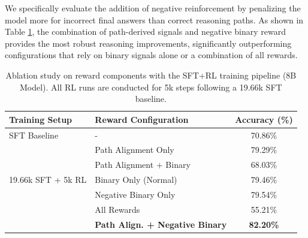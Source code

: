 \documentclass{article}
\theoremstyle{plain}
\theoremstyle{definition}
\theoremstyle{remark}
\begin{document}
We specifically evaluate the addition of negative reinforcement \cite{Zhu2025} by penalizing the model more for incorrect final answers than correct reasoning paths. As shown in Table \ref{tab:sft_rl_ablation}, the combination of path-derived signals and negative binary reward provides the most robust reasoning improvements, significantly outperforming configurations that rely on binary signals alone or a combination of all rewards.

\begin{table}[ht]
\caption{Ablation study on reward components with the SFT+RL training pipeline (8B Model). All RL runs are conducted for 5k steps following a 19.66k SFT baseline.}
\label{tab:sft_rl_ablation}
\vskip 0.15in
\begin{center}
\begin{small}
\begin{sc}
\begin{tabular}{llc}
\toprule
Training Setup & Reward Configuration & Accuracy (\%) \\
\midrule
SFT Baseline  & - & 70.86\% \\
\midrule
\multirow{5}{*}{19.66k SFT + 5k RL} 
  & Path Alignment Only & 79.29\% \\
  & Path Alignment + Binary & 68.03\% \\
  & Binary Only (Normal) & 79.46\% \\
  & Negative Binary Only & 79.54\% \\
  & All Rewards & 55.21\% \\
  & \textbf{Path Align. + Negative Binary} & \textbf{82.20\%} \\
\bottomrule
\end{tabular}
\end{sc}
\end{small}
\end{center}
\vskip -0.1in
\end{table}
\end{document}
